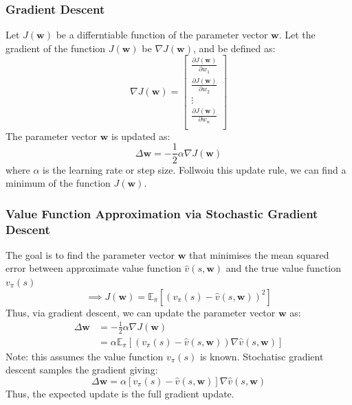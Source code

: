 \subsubsection*{Gradient Descent}
Let \(J(\mathbf{w})\) be a differntiable function of the parameter vector \(\mathbf{w}\).
Let the gradient of the function \(J(\mathbf{w})\) be \(\nabla J(\mathbf{w})\), and be 
defined as:
\[
    \nabla J(\mathbf{w}) = \begin{bmatrix}
        \frac{\partial J(\mathbf{w})}{\partial w_1} \\
        \frac{\partial J(\mathbf{w})}{\partial w_2} \\
        \vdots \\
        \frac{\partial J(\mathbf{w})}{\partial w_n} \\
    \end{bmatrix}
\]
The parameter vector \(\mathbf{w}\) is updated as:
\[
    \Delta \mathbf{w} = -\frac{1}{2} \alpha \nabla J(\mathbf{w})
\]
where \(\alpha\) is the learning rate or step size. Follwoiu this update rule, we can
find a minimum of the function \(J(\mathbf{w})\).

\subsubsection{Value Function Approximation via Stochastic Gradient Descent}
The goal is to find the parameter vector \(\mathbf{w}\) that minimises the mean squared
error between approximate value function \(\hat{v}(s,\mathbf{w})\) and the true value 
function \(v_{\pi}(s)\)
\[
    \implies J(\mathbf{w}) = \mathbb{E}_{\pi}\left[ 
        \left( 
            v_{\pi}(s) - \hat{v}(s,\mathbf{w})
         \right)^{2} 
     \right] 
\]
Thus, via gradient descent, we can update the parameter vector \(\mathbf{w}\) as:
\[
    \begin{aligned}
        \Delta \mathbf{w} &= -\frac{1}{2} \alpha \nabla J(\mathbf{w}) \\
        &= \alpha \mathbb{E}_{\pi} \left[ 
            (v_{\pi}(s) - \hat{v}(s,\mathbf{w})) \nabla \hat{v}(s,\mathbf{w})
         \right] 
    \end{aligned}  
\]
Note: this assumes the value function \(v_{\pi}(s)\) is known.
Stochatisc gradient descent samples the gradient giving:
\[
    \Delta \mathbf{w} = \alpha \left[ 
        v_{\pi}(s) - \hat{v}(s,\mathbf{w})
     \right] \nabla \hat{v}(s,\mathbf{w})  
\]
Thus, the expected update is the full gradient update.


